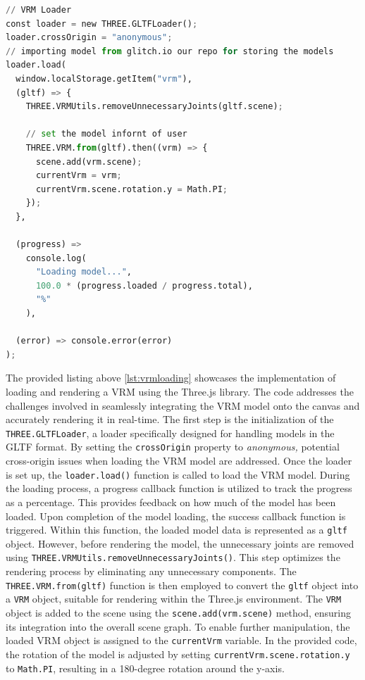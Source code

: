 \begin{lstlisting}[language=Python,caption=Loading the VRM onto the canvas,label=lst:vrmloading]
// VRM Loader
const loader = new THREE.GLTFLoader();
loader.crossOrigin = "anonymous";
// importing model from glitch.io our repo for storing the models
loader.load(
  window.localStorage.getItem("vrm"),
  (gltf) => {
    THREE.VRMUtils.removeUnnecessaryJoints(gltf.scene);

    // set the model infornt of user
    THREE.VRM.from(gltf).then((vrm) => {
      scene.add(vrm.scene);
      currentVrm = vrm;
      currentVrm.scene.rotation.y = Math.PI;
    });
  },

  (progress) =>
    console.log(
      "Loading model...",
      100.0 * (progress.loaded / progress.total),
      "%"
    ),

  (error) => console.error(error)
);
\end{lstlisting}


The provided listing above \ref{lst:vrmloading} showcases the implementation of loading and rendering a VRM using the Three.js library. 
The code addresses the challenges involved in seamlessly integrating the VRM model onto the canvas and accurately rendering it in real-time.
The first step is the initialization of the \texttt{THREE.GLTFLoader}, a loader specifically designed for handling models in the GLTF format. 
By setting the \texttt{crossOrigin} property to \emph{anonymous,} potential cross-origin issues when loading the VRM model are addressed.
Once the loader is set up, the \texttt{loader.load()} function is called to load the VRM model. During the loading process, 
a progress callback function is utilized to track the progress as a percentage. This provides feedback on how much of the model has been loaded.
Upon completion of the model loading, the success callback function is triggered. Within this function, 
the loaded model data is represented as a \texttt{gltf} object. However, before rendering the model, the unnecessary 
joints are removed using \texttt{THREE.VRMUtils.removeUnnecessaryJoints()}. This step optimizes the 
rendering process by eliminating any unnecessary components.
The \texttt{THREE.VRM.from(gltf)} function is then employed to convert the \texttt{gltf} object into a \texttt{VRM} object, 
suitable for rendering within the Three.js environment. The \texttt{VRM} object is added to the scene using 
the \texttt{scene.add(vrm.scene)} method, ensuring its integration into the overall scene graph.
To enable further manipulation, the loaded VRM object is assigned to the \texttt{currentVrm} variable. 
In the provided code, the rotation of the model is adjusted by setting \texttt{currentVrm.scene.rotation.y} to 
\texttt{Math.PI}, resulting in a 180-degree rotation around the y-axis.

